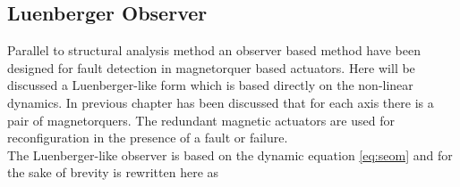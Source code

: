 \subsection{Luenberger Observer} 
\label{sec:simpleObserver}

Parallel to structural analysis method an observer based method have been designed for fault detection in magnetorquer based actuators. Here will be discussed a Luenberger-like form which is based directly on the non-linear dynamics. In previous chapter has been discussed that for each axis there is a pair of magnetorquers. The redundant magnetic actuators are used for reconfiguration in the presence of a fault or failure.\\    The Luenberger-like observer is based on the dynamic equation \ref{eq:seom} and for the sake of brevity is rewritten here as   

